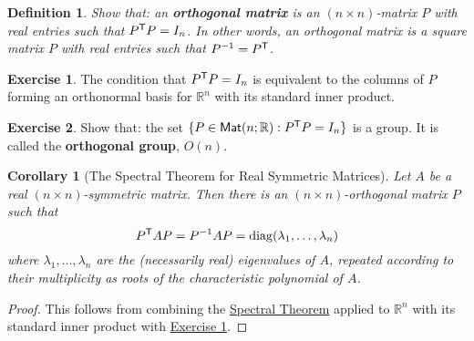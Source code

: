 \documentclass[11pt]{amsbook}
\newtheorem{definition}[theorem]{Definition}
\newtheorem{corollary}[theorem]{Corollary}
\theoremstyle{definition}
\newtheorem{exercise}{Exercise}
\begin{document}
\begin{definition}
Show that: an {\bf orthogonal matrix} is an $(n\times n)$-matrix $P$ with real entries such that $P^{\sf T}P = I_n$. In other words, an orthogonal matrix is a square matrix $P$ with real entries such that $P^{-1} = P^{\sf T}$.
\end{definition}

\begin{exercise}\label{orthmat}
The condition that $P^{\sf T}P = I_n$ is equivalent to the columns of $P$ forming an orthonormal basis for $\mathbb{R}^n$ with its standard inner product.
\end{exercise}

\begin{exercise}
Show that: the set $\{ P\in {\sf Mat}(n;\mathbb{R}) : P^{\sf T}P = I_n \}$ is a group. It is called the {\bf orthogonal group}, $O(n)$.
\end{exercise}

\begin{corollary}[The Spectral Theorem for Real Symmetric Matrices]\label{spectralmatrices} Let $A$ be a real $(n\times n)$-symmetric matrix. Then there is an $(n\times n)$-orthogonal matrix $P$ such that $$P^{\sf T}AP = P^{-1}AP = {\rm diag} (\lambda_1, \ldots , \lambda_n)$$ where $\lambda_1, \ldots , \lambda_n$ are the (necessarily real) eigenvalues of $A$, repeated according to their multiplicity as roots of the characteristic polynomial of $A$.
\end{corollary}

\begin{proof} This follows from combining the \hyperref[spectral]{Spectral Theorem} applied to $\mathbb{R}^n$ with its standard inner product with \hyperref[orthmat]{Exercise \ref{orthmat}}.
\end{proof}
\end{document}
